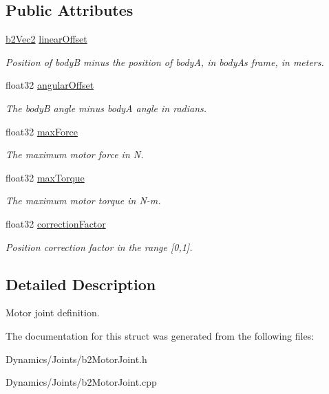 \subsection*{Public Attributes}
\begin{DoxyCompactItemize}
\item 
\mbox{\label{structb2MotorJointDef_a2c957cffc2af66c6c8077c069b906bc4}} 
\mbox{\hyperlink{structb2Vec2}{b2\+Vec2}} \mbox{\hyperlink{structb2MotorJointDef_a2c957cffc2af66c6c8077c069b906bc4}{linear\+Offset}}
\begin{DoxyCompactList}\small\item\em Position of bodyB minus the position of bodyA, in bodyA\textquotesingle{}s frame, in meters. \end{DoxyCompactList}\item 
\mbox{\label{structb2MotorJointDef_abdb42eff4aeff1d48038e084c57e1cb0}} 
float32 \mbox{\hyperlink{structb2MotorJointDef_abdb42eff4aeff1d48038e084c57e1cb0}{angular\+Offset}}
\begin{DoxyCompactList}\small\item\em The bodyB angle minus bodyA angle in radians. \end{DoxyCompactList}\item 
\mbox{\label{structb2MotorJointDef_a2f66d1b99c654e112dc68e15375d5ee7}} 
float32 \mbox{\hyperlink{structb2MotorJointDef_a2f66d1b99c654e112dc68e15375d5ee7}{max\+Force}}
\begin{DoxyCompactList}\small\item\em The maximum motor force in N. \end{DoxyCompactList}\item 
\mbox{\label{structb2MotorJointDef_afcf5dd58166917a4574d1f28f6bb3660}} 
float32 \mbox{\hyperlink{structb2MotorJointDef_afcf5dd58166917a4574d1f28f6bb3660}{max\+Torque}}
\begin{DoxyCompactList}\small\item\em The maximum motor torque in N-\/m. \end{DoxyCompactList}\item 
\mbox{\label{structb2MotorJointDef_ab282afdb92d07ead23530f57fd0eb9ea}} 
float32 \mbox{\hyperlink{structb2MotorJointDef_ab282afdb92d07ead23530f57fd0eb9ea}{correction\+Factor}}
\begin{DoxyCompactList}\small\item\em Position correction factor in the range \mbox{[}0,1\mbox{]}. \end{DoxyCompactList}\end{DoxyCompactItemize}


\subsection{Detailed Description}
Motor joint definition. 

The documentation for this struct was generated from the following files\+:\begin{DoxyCompactItemize}
\item 
Dynamics/\+Joints/b2\+Motor\+Joint.\+h\item 
Dynamics/\+Joints/b2\+Motor\+Joint.\+cpp\end{DoxyCompactItemize}
